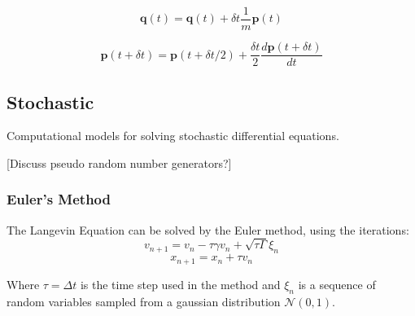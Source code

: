 $$\mathbf{q}(t) = \mathbf{q}(t) + \delta t \frac{1}{m}\mathbf{p}(t)  $$

$$\mathbf{p}(t+\delta t) = \mathbf{p}(t+\delta t/2) + \frac{\delta t}{2}\frac{d \mathbf{p}(t+\delta t)}{dt}$$

\subsection{Stochastic}

Computational models for solving stochastic differential equations.

[Discuss pseudo random number generators?]

\subsubsection{Euler's Method} 

The Langevin Equation can be solved by the Euler method, using the iterations:
$$ v_{n+1} = v_{n} - \tau \gamma v_{n} + \sqrt{\tau\Gamma}\xi_{n} $$
$$ x_{n+1} = x_{n} + \tau v_{n}$$

Where $\tau = \Delta t$ is the time step used in the method and $\xi_{n}$ is a sequence of random variables sampled from a gaussian distribution $\mathcal{N}(0,1)$. 
